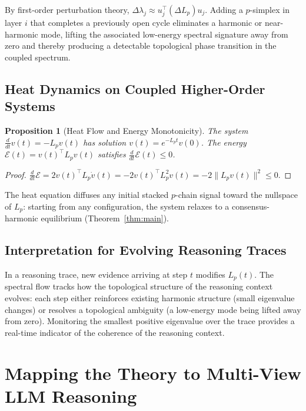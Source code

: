 \documentclass[11pt]{article}
\newtheorem{proposition}[theorem]{Proposition}
\theoremstyle{definition}
\theoremstyle{remark}
\begin{document}
By first-order perturbation theory, $\Delta\lambda_j \approx u_j^\top(\Delta L_p)u_j$.
Adding a $p$-simplex in layer $i$ that completes a previously open cycle eliminates a harmonic or near-harmonic mode, lifting the associated low-energy spectral signature away from zero and thereby producing a detectable topological phase transition in the coupled spectrum.

\subsection{Heat Dynamics on Coupled Higher-Order Systems}

\begin{proposition}[Heat Flow and Energy Monotonicity]
\label{prop:heat}
The system $\frac{d}{dt}v(t) = -L_p v(t)$ has solution $v(t)=e^{-L_p t}v(0)$.
The energy $\mathcal{E}(t) = v(t)^\top L_p v(t)$ satisfies
$\frac{d}{dt}\mathcal{E}(t) \leq 0$.
\end{proposition}

\begin{proof}
$\frac{d}{dt}\mathcal{E} = 2v(t)^\top L_p\dot{v}(t) = -2v(t)^\top L_p^2
v(t) = -2\|L_p v(t)\|^2 \leq 0$.
\end{proof}

The heat equation diffuses any initial stacked $p$-chain signal toward the nullspace of $L_p$:
starting from any configuration, the system relaxes to a consensus-harmonic
equilibrium (Theorem~\ref{thm:main}).

\subsection{Interpretation for Evolving Reasoning Traces}

In a reasoning trace, new evidence arriving at step $t$ modifies $L_p(t)$. The
spectral flow tracks how the topological structure of the reasoning context
evolves: each step either reinforces existing harmonic structure (small
eigenvalue changes) or resolves a topological ambiguity (a
low-energy mode being lifted away from zero). Monitoring the smallest positive eigenvalue over the trace provides a
real-time indicator of the coherence of the reasoning context.


\section{Mapping the Theory to Multi-View LLM Reasoning}
\label{sec:application}
\end{document}

